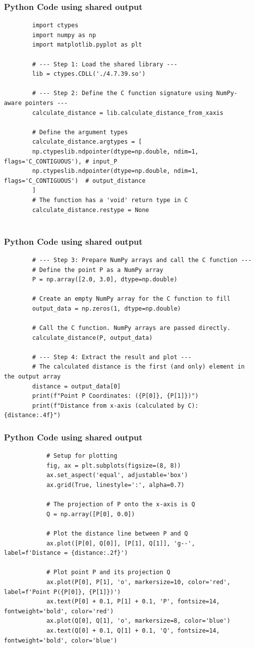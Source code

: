 \documentclass{beamer}
\begin{document}
	\begin{frame}[fragile]
		\frametitle{Python Code using shared output}
		\begin{lstlisting}
		import ctypes
		import numpy as np
		import matplotlib.pyplot as plt
		
		# --- Step 1: Load the shared library ---
		lib = ctypes.CDLL('./4.7.39.so')
		
		# --- Step 2: Define the C function signature using NumPy-aware pointers ---
		calculate_distance = lib.calculate_distance_from_xaxis
		
		# Define the argument types
		calculate_distance.argtypes = [
		np.ctypeslib.ndpointer(dtype=np.double, ndim=1, flags='C_CONTIGUOUS'), # input_P
		np.ctypeslib.ndpointer(dtype=np.double, ndim=1, flags='C_CONTIGUOUS')  # output_distance
		]
		# The function has a 'void' return type in C
		calculate_distance.restype = None
		
		\end{lstlisting}
	\end{frame}
	\begin{frame}[fragile]
		\frametitle{Python Code using shared output}
		\begin{lstlisting}		
		# --- Step 3: Prepare NumPy arrays and call the C function ---
		# Define the point P as a NumPy array
		P = np.array([2.0, 3.0], dtype=np.double)
		
		# Create an empty NumPy array for the C function to fill
		output_data = np.zeros(1, dtype=np.double)
		
		# Call the C function. NumPy arrays are passed directly.
		calculate_distance(P, output_data)
		
		# --- Step 4: Extract the result and plot ---
		# The calculated distance is the first (and only) element in the output array
		distance = output_data[0]
		print(f"Point P Coordinates: ({P[0]}, {P[1]})")
		print(f"Distance from x-axis (calculated by C): {distance:.4f}")
		\end{lstlisting}
	\end{frame}
	\begin{frame}[fragile]
		\frametitle{Python Code using shared output}
		\begin{lstlisting}
			# Setup for plotting
			fig, ax = plt.subplots(figsize=(8, 8))
			ax.set_aspect('equal', adjustable='box')
			ax.grid(True, linestyle=':', alpha=0.7)
			
			# The projection of P onto the x-axis is Q
			Q = np.array([P[0], 0.0])
			
			# Plot the distance line between P and Q
			ax.plot([P[0], Q[0]], [P[1], Q[1]], 'g--', label=f'Distance = {distance:.2f}')
			
			# Plot point P and its projection Q
			ax.plot(P[0], P[1], 'o', markersize=10, color='red', label=f'Point P({P[0]}, {P[1]})')
			ax.text(P[0] + 0.1, P[1] + 0.1, 'P', fontsize=14, fontweight='bold', color='red')
			ax.plot(Q[0], Q[1], 'o', markersize=8, color='blue')
			ax.text(Q[0] + 0.1, Q[1] + 0.1, 'Q', fontsize=14, fontweight='bold', color='blue')
		\end{lstlisting}
	\end{frame}
\end{document}
